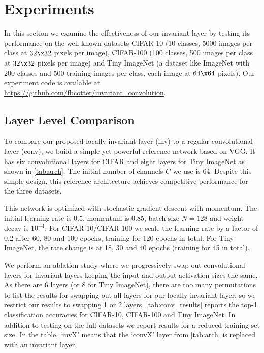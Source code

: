 \section{Experiments}\label{sec:experiments}
In this section we examine the effectiveness of our invariant layer by testing
its performance on the well known datasets CIFAR-10 (10 classes, 5000 images per class
at $32\x 32$ pixels per image), CIFAR-100 (100 classes, 500 images per class at 
$32\x 32$ pixels per image) and Tiny ImageNet\cite{li_tiny_nodate} (a dataset
like ImageNet with 200 classes and 500 training images per class, each image at
$64 \x 64$ pixels). Our experiment code is available at
\url{https://github.com/fbcotter/invariant_convolution}.

\subsection{Layer Level Comparison}\label{sec:conv_exp}
To compare our proposed locally invariant layer (inv) to a regular convolutional
layer (conv), we build a simple yet powerful reference network based on VGG.
It has six convolutional layers for CIFAR and eight layers for Tiny ImageNet as shown in
\autoref{tab:arch}. The initial number of channels $C$ we use is 64. Despite
this simple design, this reference architecture achieves competitive performance
for the three datasets.

This network is optimized with stochastic gradient descent with momentum. The
initial learning rate is $0.5$, momentum is $0.85$, batch size $N=128$ and
weight decay is $10^{-4}$. For CIFAR-10/CIFAR-100 we scale the learning rate by
a factor of 0.2 after 60, 80 and 100 epochs, training for 120 epochs in total.
For Tiny ImageNet, the rate change is at 18, 30 and 40 epochs (training for 45 in total).



We perform an ablation study where we progressively swap out convolutional
layers for invariant layers keeping the input and output activation sizes the
same. As there are 6 layers (or 8 for Tiny ImageNet), there are too many
permutations to list the results for swapping out all layers for our locally
invariant layer, so we restrict our results to swapping 1 or 2 layers. 
\autoref{tab:conv_results} reports the top-1 classification accuracies for
CIFAR-10, CIFAR-100 and Tiny ImageNet. In addition to testing on the full
datasets we report results for a reduced training set size. In the table, `invX'
means that the `convX' layer from \autoref{tab:arch} is replaced with an 
invariant layer.

